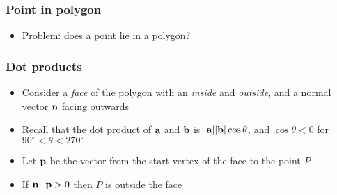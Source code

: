 \documentclass{beamer}
\begin{document}
\begin{frame}
 \frametitle{Point in polygon}
 \begin{itemize}
  \item Problem: does a point lie in a polygon?
 \end{itemize}
 \begin{center}
  \scalebox{1.0} {
  }
 \end{center}
\end{frame}

\begin{frame}
 \frametitle{Dot products}
 \begin{itemize}
  \item Consider a \emph{face} of the polygon with an \emph{inside} and
        \emph{outside}, and a normal vector $\textbf{n}$ facing outwards
  \item Recall that the dot product of $\textbf{a}$ and $\textbf{b}$ is
        $|\textbf{a}||\textbf{b}| \cos \theta$, and $\cos \theta < 0$ for
        $90^\circ < \theta < 270^\circ$
  \item Let $\textbf{p}$ be the vector from the start vertex of the face
        to the point $P$
  \item If $\textbf{n} \cdot \textbf{p} > 0$ then $P$ is outside the face
 \end{itemize}
 \begin{center}
  \scalebox{1.0} {
  }
 \end{center}
\end{frame}
\end{document}
